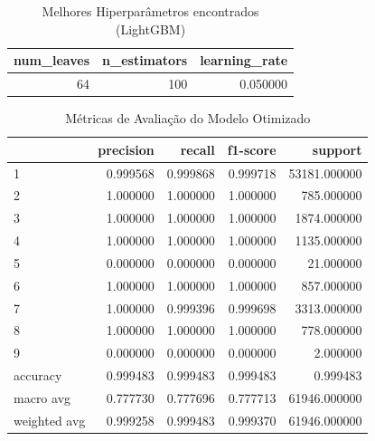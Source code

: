 \begin{table}
\caption{Melhores Hiperparâmetros encontrados (LightGBM)}
\label{tab:params_lgbm}
\begin{tabular}{rrr}
\toprule
num_leaves & n_estimators & learning_rate \\
\midrule
64 & 100 & 0.050000 \\
\bottomrule
\end{tabular}
\end{table}


\begin{table}
\caption{Métricas de Avaliação do Modelo Otimizado}
\label{tab:metricas_lgbm}
\begin{tabular}{lrrrr}
\toprule
 & precision & recall & f1-score & support \\
\midrule
1 & 0.999568 & 0.999868 & 0.999718 & 53181.000000 \\
2 & 1.000000 & 1.000000 & 1.000000 & 785.000000 \\
3 & 1.000000 & 1.000000 & 1.000000 & 1874.000000 \\
4 & 1.000000 & 1.000000 & 1.000000 & 1135.000000 \\
5 & 0.000000 & 0.000000 & 0.000000 & 21.000000 \\
6 & 1.000000 & 1.000000 & 1.000000 & 857.000000 \\
7 & 1.000000 & 0.999396 & 0.999698 & 3313.000000 \\
8 & 1.000000 & 1.000000 & 1.000000 & 778.000000 \\
9 & 0.000000 & 0.000000 & 0.000000 & 2.000000 \\
accuracy & 0.999483 & 0.999483 & 0.999483 & 0.999483 \\
macro avg & 0.777730 & 0.777696 & 0.777713 & 61946.000000 \\
weighted avg & 0.999258 & 0.999483 & 0.999370 & 61946.000000 \\
\bottomrule
\end{tabular}
\end{table}
